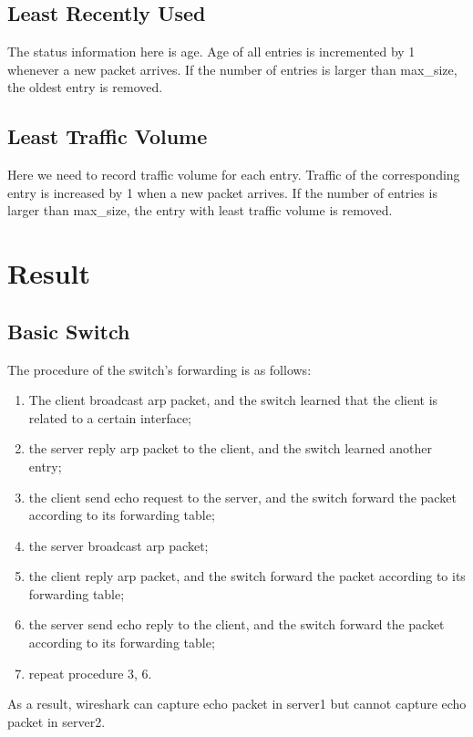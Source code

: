 \documentclass[12pt,a4paper,UTF8]{article}
\begin{document}
\subsection{Least Recently Used}
The status information here is age. Age of all entries is incremented by 1 whenever a new packet arrives. If the number of entries is larger than max\_size, the oldest entry is removed.


\subsection{Least Traffic Volume}
Here we need to record traffic volume for each entry. Traffic of the corresponding entry is increased by 1 when a new packet arrives. If the number of entries is larger than max\_size, the entry with least traffic volume is removed.


\section{Result}
\subsection{Basic Switch}
The procedure of the switch's forwarding is as follows:
\begin{enumerate}
	\item The client broadcast arp packet, and the switch learned that the client is related to a certain interface;
	\item the server reply arp packet to the client, and the switch learned another entry;
	\item the client send echo request to the server, and the switch forward the packet according to its forwarding table;
	\item the server broadcast arp packet;
	\item the client reply arp packet, and the switch forward the packet according to its forwarding table;
	\item the server send echo reply to the client, and the switch forward the packet according to its forwarding table;
	\item repeat procedure 3, 6.
\end{enumerate}
As a result, wireshark can capture echo packet in server1 but cannot capture echo packet in server2.
\end{document}
